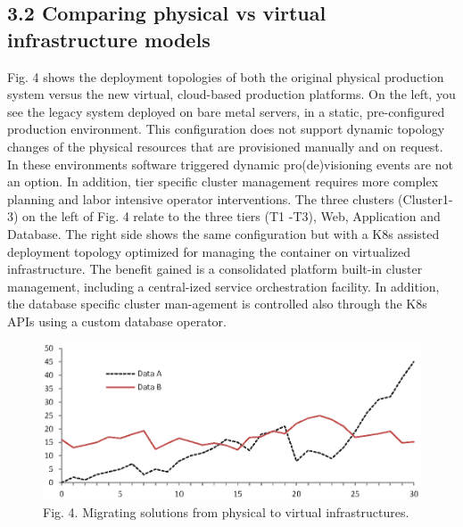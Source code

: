 \documentclass[runningheads]{llncs}
\begin{document}
\subsection{3.2	Comparing physical vs virtual infrastructure models}
Fig. 4 shows the deployment topologies of both the original physical production system versus the new virtual, cloud-based production platforms. On the left, you see the legacy system deployed on bare metal servers, in a static, pre-configured production environment. This configuration does not support dynamic topology changes of the physical resources that are provisioned manually and on request. In these environments software triggered dynamic pro(de)visioning events are not an option. 
In addition, tier specific cluster management requires more complex planning and labor intensive operator interventions. The three clusters (Cluster1-3) on the left of Fig. 4 relate to the three tiers (T1 -T3), Web, Application and Database. The right side shows the same configuration but with a K8s assisted deployment topology optimized for managing the container on virtualized infrastructure. The benefit gained is a consolidated platform built-in cluster management, including a central-ized service orchestration facility. In addition, the database specific cluster man-agement is controlled also through the K8s APIs using a custom database operator.

\begin{figure}
\includegraphics[width=\textwidth]{fig1.eps}
\caption{Fig. 4. Migrating solutions from physical to virtual infrastructures.} \label{fig4}
\end{figure}
\end{document}
